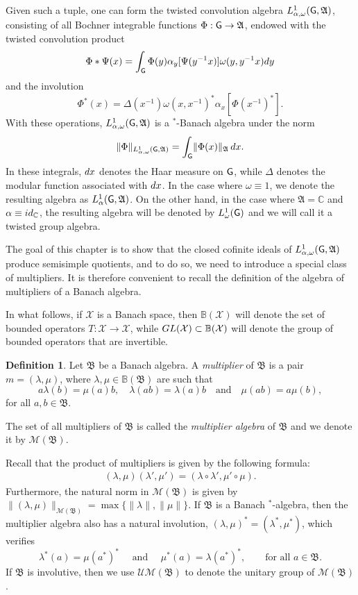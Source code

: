 \documentclass[11pt]{article}
\newcommand{\A}{\mathfrak{A}}
\newcommand{\B}{\mathfrak{B}}
\newcommand{\CC}{\mathbb{C}}
\def\X{\mathcal{X}}
\def\d{{\rm d}}
\def\G{{\sf G}}
\providecommand{\norm}[1]{\lVert#1\rVert}
\theoremstyle{definition}
\newtheorem{defn}[thm]{Definition}
\theoremstyle{remark}
\numberwithin{equation}{section}
\numberwithin{equation}{section}
\begin{document}
Given such a tuple, one can form the twisted convolution algebra $L^1_{\alpha,\omega}(\G,\A)$, consisting of all Bochner integrable functions $\Phi:\G\to\A$, endowed with the twisted convolution product 
\begin{equation*}\label{convolution}
    \Phi*\Psi(x)=\int_\G \Phi(y)\alpha_y[\Psi(y^{-1}x)]\omega(y,y^{-1}x)\d y
\end{equation*} 
and the involution \begin{equation*}\label{involution}
    \Phi^*(x)=\Delta(x^{-1})\omega(x,x^{-1})^*\alpha_x[\Phi(x^{-1})^*].
\end{equation*} 
With these operations, $L^1_{\alpha,\omega}(\G,\A)$ is a $^*$-Banach algebra under the norm 
$$
\norm{\Phi}_{L^1_{\alpha,\omega}(\G,\A)}=\int_\G\norm{\Phi(x)}_{\A}\,\d x.
$$ 
In these integrals, $\d x$ denotes the Haar measure on $\G$, while $\Delta$ denotes the modular function associated with $\d x$. In the case where $\omega\equiv 1$, we denote the resulting algebra as $L^1_\alpha(\G,\A)$. On the other hand, in the case where $\A=\CC$ and $\alpha\equiv{\rm id}_\CC$, the resulting algebra will be denoted by $L^1_\omega(\G)$ and we will call it a twisted group algebra.

The goal of this chapter is to show that the closed cofinite ideals of $L^1_{\alpha,\omega}(\G,\A)$ produce semisimple quotients, and to do so, we need to introduce a special class of multipliers. It is therefore convenient to recall the definition of the algebra of multipliers of a Banach algebra. 

In what follows, if $\X$ is a Banach space, then $\mathbb B(\X)$ will denote the set of bounded operators $T:\X\to\X$, while ${\rm GL}(\X)\subset\mathbb B(\X) $ will denote the group of bounded operators that are invertible.


\begin{defn}
Let $\B$ be a Banach algebra. A \emph{multiplier} of $\B$ is a pair $m=(\lambda,\mu)$, where $\lambda,\mu\in \mathbb B(\B)$ are such that
$$
a\lambda(b)=\mu(a)b, \quad \lambda(ab)=\lambda(a)b \quad\text{and}\quad \mu(ab)=a\mu(b),
$$
for all $a,b\in\B$.

The set of all multipliers of $\B$ is called the \emph{multiplier algebra} of $\B$ and we denote it by $\mathcal M(\B)$.
\end{defn}

Recall that the product of multipliers is given by the following formula:
\begin{align*}
(\lambda,\mu)(\lambda',\mu')=(\lambda\circ\lambda',\mu'\circ\mu).
\end{align*}
Furthermore, the natural norm in $\mathcal M(\B)$ is given by $\norm{(\lambda,\mu)}_{\mathcal M(\B)}=\max\{\norm{\lambda},\norm{\mu}\}$. If $\B$ is a Banach $^*$-algebra, then the multiplier algebra also has a natural involution, $(\lambda,\mu)^*=(\lambda^*,\mu^*)$, which verifies 
$$
\lambda^*(a)=\mu(a^*)^*\quad\text{ and }\quad\mu^*(a)=\lambda(a^*)^*,\quad\quad\text{for all }a\in\B.
$$
If $\B$ is involutive, then we use $\mathcal{UM}({\B})$ to denote the unitary group of $\mathcal{M}({\B})$.
\end{document}

